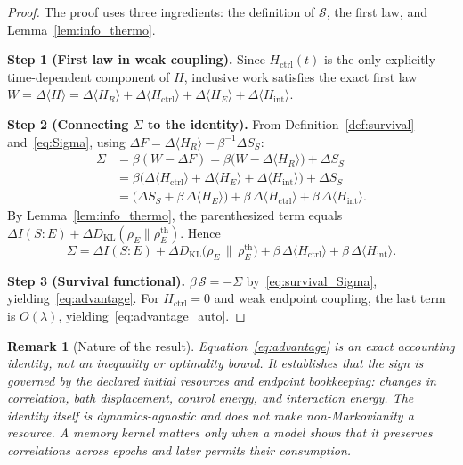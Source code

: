 \documentclass[12pt]{article}
\newtheorem{remark}[theorem]{Remark}
\begin{document}
\begin{proof}
The proof uses three ingredients: the definition of
$\mathcal{S}$, the first law, and
Lemma~\ref{lem:info_thermo}.

\noindent\textbf{Step 1 (First law in weak coupling).}
Since $H_{\mathrm{ctrl}}(t)$ is the only explicitly time-dependent
component of $H$, inclusive work satisfies the exact first law
$W = \Delta\langle H \rangle
= \Delta\langle H_R \rangle
  + \Delta\langle H_{\mathrm{ctrl}} \rangle
  + \Delta\langle H_E \rangle
  + \Delta\langle H_{\mathrm{int}} \rangle$.

\noindent\textbf{Step 2 (Connecting $\Sigma$ to the
identity).}
From Definition~\ref{def:survival} and~\eqref{eq:Sigma},
using $\Delta F = \Delta\langle H_R \rangle
- \beta^{-1}\Delta S_S$:
\begin{align}
\Sigma &= \beta(W - \Delta F)
= \beta\bigl(W - \Delta\langle H_R \rangle\bigr)
  + \Delta S_S \nonumber \\
&= \beta\bigl(\Delta\langle H_{\mathrm{ctrl}} \rangle
  + \Delta\langle H_E \rangle
  + \Delta\langle H_{\mathrm{int}} \rangle\bigr) + \Delta S_S
\nonumber \\
&= \bigl(\Delta S_S
  + \beta\,\Delta\langle H_E \rangle\bigr)
  + \beta\,\Delta\langle H_{\mathrm{ctrl}} \rangle
  + \beta\,\Delta\langle H_{\mathrm{int}} \rangle.
\label{eq:Sigma_decomp}
\end{align}
By Lemma~\ref{lem:info_thermo}, the parenthesized term
equals
$\Delta I(S{:}E)
+ \Delta D_{\mathrm{KL}}(\rho_E \| \rho_E^{\mathrm{th}})$.
Hence
\begin{equation}
\label{eq:Sigma_general}
\Sigma = \Delta I(S{:}E)
  + \Delta D_{\mathrm{KL}}\!\bigl(\rho_E \,\big\|\,
    \rho_E^{\mathrm{th}}\bigr)
  + \beta\,\Delta\langle H_{\mathrm{ctrl}} \rangle
  + \beta\,\Delta\langle H_{\mathrm{int}} \rangle.
\end{equation}

\noindent\textbf{Step 3 (Survival functional).}
$\beta\,\mathcal{S} = -\Sigma$ by~\eqref{eq:survival_Sigma},
yielding~\eqref{eq:advantage}.
For $H_{\mathrm{ctrl}} = 0$ and weak endpoint coupling, the last
term is $O(\lambda)$, yielding~\eqref{eq:advantage_auto}.
\end{proof}

\begin{remark}[Nature of the result]
\label{rem:identity_not_bound}
Equation~\eqref{eq:advantage} is an exact
\emph{accounting identity}, not an inequality or
optimality bound.
It establishes that the sign is governed by the declared initial
resources and endpoint bookkeeping: changes in correlation, bath
displacement, control energy, and interaction energy.  The identity
itself is dynamics-agnostic and does not make non-Markovianity a
resource.  A memory kernel matters only when a model shows that it
preserves correlations across epochs and later permits their
consumption.
\end{remark}
\end{document}
